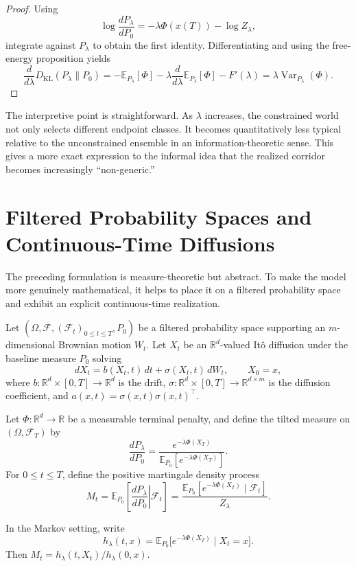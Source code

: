 \documentclass[12pt]{article}
\begin{document}
\begin{proof}
Using
\[
\log \frac{dP_\lambda}{dP_0} = -\lambda \Phi(x(T)) - \log Z_\lambda,
\]
integrate against $P_\lambda$ to obtain the first identity. Differentiating and using the free-energy proposition yields
\[
\frac{d}{d\lambda}D_{\mathrm{KL}}(P_\lambda\|P_0)
= -\mathbb{E}_{P_\lambda}[\Phi] - \lambda\frac{d}{d\lambda}\mathbb{E}_{P_\lambda}[\Phi] - F'(\lambda)
= \lambda\operatorname{Var}_{P_\lambda}(\Phi).
\]
\end{proof}

The interpretive point is straightforward. As $\lambda$ increases, the constrained world not only selects different endpoint classes. It becomes quantitatively less typical relative to the unconstrained ensemble in an information-theoretic sense. This gives a more exact expression to the informal idea that the realized corridor becomes increasingly ``non-generic.''

\section{Filtered Probability Spaces and Continuous-Time Diffusions}

The preceding formulation is measure-theoretic but abstract. To make the model more genuinely mathematical, it helps to place it on a filtered probability space and exhibit an explicit continuous-time realization.

Let $(\Omega,\mathcal F,(\mathcal F_t)_{0\le t\le T},P_0)$ be a filtered probability space supporting an $m$-dimensional Brownian motion $W_t$. Let $X_t$ be an $\mathbb R^d$-valued It\^o diffusion under the baseline measure $P_0$ solving
\[
dX_t = b(X_t,t)\,dt + \sigma(X_t,t)\,dW_t,
\qquad X_0 = x,
\]
where $b: \mathbb R^d \times [0,T] \to \mathbb R^d$ is the drift, $\sigma: \mathbb R^d \times [0,T] \to \mathbb R^{d\times m}$ is the diffusion coefficient, and $a(x,t)=\sigma(x,t)\sigma(x,t)^\top$.

Let $\Phi: \mathbb R^d \to \mathbb R$ be a measurable terminal penalty, and define the tilted measure on $(\Omega,\mathcal F_T)$ by
\[
\frac{dP_\lambda}{dP_0}
= \frac{e^{-\lambda \Phi(X_T)}}{\mathbb E_{P_0}[e^{-\lambda \Phi(X_T)}]}.
\]
For $0 \le t \le T$, define the positive martingale density process
\[
M_t = \mathbb E_{P_0}\!\left[\left.\frac{dP_\lambda}{dP_0}\right|\mathcal F_t\right]
= \frac{\mathbb E_{P_0}[e^{-\lambda \Phi(X_T)}\mid \mathcal F_t]}{Z_\lambda}.
\]

In the Markov setting, write
\[
h_\lambda(t,x) = \mathbb E_{P_0}\bigl[e^{-\lambda \Phi(X_T)} \mid X_t=x\bigr].
\]
Then $M_t = h_\lambda(t,X_t)/h_\lambda(0,x)$.
\end{document}
